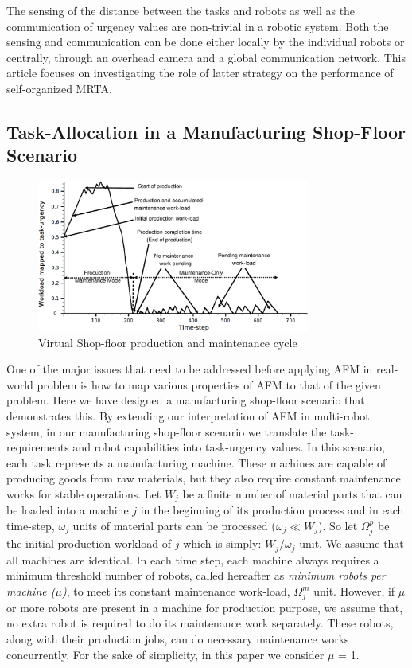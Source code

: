 \documentclass[smallcondensed]{svjour3}
\begin{document}
The sensing of the distance between the tasks and robots as well as the communication of urgency values are non-trivial in a robotic system.  Both the sensing and communication can be done either locally by the individual robots or centrally, through an overhead camera and a global communication network.
This article focuses on investigating the role of latter strategy on the performance of self-organized MRTA.
\subsection{Task-Allocation in a Manufacturing Shop-Floor Scenario}
\label{sec:mrta}
\begin{figure}[htp]
\centering
\includegraphics[width=0.8\textwidth, angle=0]
{./VSP.eps}
\caption{\small Virtual Shop-floor production and maintenance cycle}
\label{fig:vsp}  %
\end{figure}
One of the major issues that need to be addressed before applying AFM in real-world problem is how to map various properties of AFM to that of the given problem. Here we have designed a manufacturing shop-floor scenario that demonstrates this. By extending our interpretation of AFM in multi-robot system, in our  manufacturing shop-floor  scenario we translate the task-requirements and robot capabilities into task-urgency values. In this scenario, each task represents a manufacturing machine. These machines are capable of producing goods from raw materials, but they also require constant maintenance works for stable operations. Let $W_{j}$ be a finite number of material parts that can be loaded into a machine $j$ in the beginning of its production process and in each time-step, $\omega_{j}$ units of material parts can be processed  ($\omega_{j} \ll W_{j} $). So let $\Omega_{j}^{p}$ be the initial production workload of $j$ which is simply: $W_{j} / \omega_{j}$ unit. We assume that all machines are identical. In each time step, each machine always requires a minimum threshold number of robots, called hereafter as {\em minimum robots per machine ($\mu$)}, to meet its constant maintenance work-load, $\Omega_{j}^{m}$ unit. However, if $\mu$ or more robots are present in a machine for production purpose, we assume that, no extra robot is required to do its maintenance work separately. These robots, along with their production jobs, can do necessary maintenance works concurrently. For the sake of simplicity, in this paper we consider $\mu$ = 1.
\end{document}
